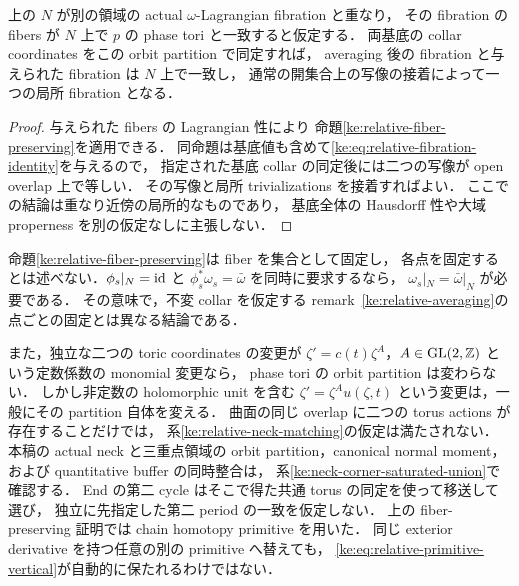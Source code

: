 \begin{corollary}
\label{ke:relative-neck-matching}
上の $N$ が別の領域の actual $\omega$-Lagrangian fibration と重なり，
その fibration の fibers が $N$ 上で $p$ の phase tori と一致すると仮定する．
両基底の collar coordinates をこの orbit partition で同定すれば，
averaging 後の fibration と与えられた fibration は $N$ 上で一致し，
通常の開集合上の写像の接着によって一つの局所 fibration となる．
\end{corollary}
\begin{proof}
与えられた fibers の Lagrangian 性により
命題\ref{ke:relative-fiber-preserving}を適用できる．
同命題は基底値も含めて\eqref{ke:eq:relative-fibration-identity}を与えるので，
指定された基底 collar の同定後には二つの写像が open overlap 上で等しい．
その写像と局所 trivializations を接着すればよい．
ここでの結論は重なり近傍の局所的なものであり，
基底全体の Hausdorff 性や大域 properness を別の仮定なしに主張しない．
\end{proof}

\begin{remark}
\label{ke:relative-neck-obstructions}
命題\ref{ke:relative-fiber-preserving}は fiber を集合として固定し，
各点を固定するとは述べない．$\phi_s|_N=\operatorname{id}$ と
$\phi_s^*\omega_s=\bar\omega$ を同時に要求するなら，
$\omega_s|_N=\bar\omega|_N$ が必要である．
その意味で，不変 collar を仮定する remark~\ref{ke:relative-averaging}の
点ごとの固定とは異なる結論である．

また，独立な二つの toric coordinates の変更が
$\zeta'=c(t)\zeta^A$，$A\in\mathrm{GL}(2,\mathbb Z)$ という定数係数の monomial 変更なら，
phase tori の orbit partition は変わらない．
しかし非定数の holomorphic unit を含む
$\zeta'=\zeta^A u(\zeta,t)$ という変更は，一般にその partition 自体を変える．
曲面の同じ overlap に二つの torus actions が存在することだけでは，
系\ref{ke:relative-neck-matching}の仮定は満たされない．
本稿の actual neck と三重点領域の orbit partition，canonical normal moment，
および quantitative buffer の同時整合は，
系\ref{ke:neck-corner-saturated-union}で確認する．
End の第二 cycle はそこで得た共通 torus の同定を使って移送して選び，
独立に先指定した第二 period の一致を仮定しない．
上の fiber-preserving 証明では chain homotopy primitive を用いた．
同じ exterior derivative を持つ任意の別の primitive へ替えても，
\eqref{ke:eq:relative-primitive-vertical}が自動的に保たれるわけではない．
\end{remark}
